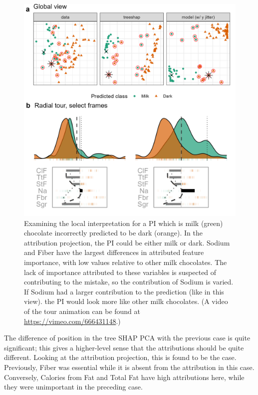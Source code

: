 \documentclass[11pt,twoside]{article}
\begin{document}
\begin{figure}

{\centering \includegraphics[width=1\linewidth]{./figures/case_chocolates_inverse} 

}

\caption{Examining the local interpretation for a PI which is milk (green) chocolate incorrectly predicted to be dark (orange). In the attribution projection, the PI could be either milk or dark. Sodium and Fiber have the largest differences in attributed feature importance, with low values relative to other milk chocolates. The lack of importance attributed to these variables is suspected of contributing to the mistake, so the contribution of Sodium is varied. If Sodium had a larger contribution to the prediction (like in this view). the PI would look more like other milk chocolates. (A video of the tour animation can be found at \url{https://vimeo.com/666431148}.)}\label{fig:casechocolatesinverse}
\end{figure}

The difference of position in the tree SHAP PCA with the previous case is quite significant; this gives a higher-level sense that the attributions should be quite different. Looking at the attribution projection, this is found to be the case. Previously, Fiber was essential while it is absent from the attribution in this case. Conversely, Calories from Fat and Total Fat have high attributions here, while they were unimportant in the preceding case.
\end{document}
